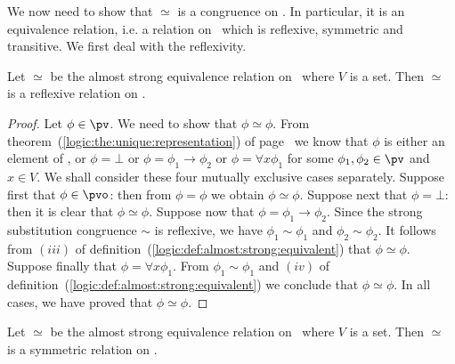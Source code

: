 We now need to show that $\simeq$ is a congruence on \pv. In
particular, it is an equivalence relation, i.e. a relation on \pv\
which is reflexive, symmetric and transitive. We first deal with the
reflexivity.

\begin{prop}\label{logic:prop:almost:strong:reflexive}
Let $\simeq$ be the almost strong equivalence relation on \pv\ where
$V$ is a set. Then $\simeq$ is a reflexive relation on \pv.
\end{prop}

\noindent
\begin{proof}
Let $\phi\in\pv$. We need to show that $\phi\simeq\phi$. From
theorem~(\ref{logic:the:unique:representation}) of
page~\pageref{logic:the:unique:representation} we know that $\phi$
is either an element of \pvo, or $\phi=\bot$ or
$\phi=\phi_{1}\to\phi_{2}$ or $\phi=\forall x\phi_{1}$ for some
$\phi_{1},\phi_{2}\in\pv$ and $x\in V$. We shall consider these four
mutually exclusive cases separately. Suppose first that
$\phi\in\pvo$: then from $\phi=\phi$ we obtain $\phi\simeq\phi$.
Suppose next that $\phi=\bot$: then it is clear that
$\phi\simeq\phi$. Suppose now that $\phi=\phi_{1}\to\phi_{2}$. Since
the strong substitution congruence $\sim$ is reflexive, we have
$\phi_{1}\sim\phi_{1}$ and $\phi_{2}\sim\phi_{2}$. It follows from
$(iii)$ of definition~(\ref{logic:def:almost:strong:equivalent})
that $\phi\simeq\phi$. Suppose finally that $\phi=\forall
x\phi_{1}$. From $\phi_{1}\sim\phi_{1}$ and $(iv)$ of
definition~(\ref{logic:def:almost:strong:equivalent}) we conclude
that $\phi\simeq\phi$. In all cases, we have proved that
$\phi\simeq\phi$.
\end{proof}


\begin{prop}\label{logic:prop:almost:strong:symmetric}
Let $\simeq$ be the almost strong equivalence relation on \pv\ where
$V$ is a set. Then $\simeq$ is a symmetric relation on \pv.
\end{prop}

